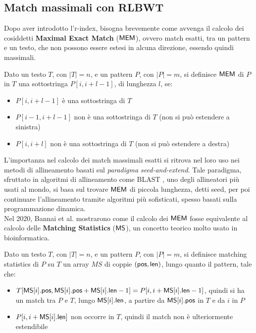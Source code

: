 \subsection{Match massimali con RLBWT}
Dopo aver introdotto l'r-index, bisogna brevemente come avvenga il
calcolo dei cosiddetti \textbf{Maximal Exact Match} ($\mbox{\rm {\sf MEM}}$), ovvero match
esatti, tra un pattern e un testo, che non 
possono essere estesi in alcuna direzione, essendo quindi massimali.
\begin{definizione}
  Dato un testo $T$, con $|T|=n$, e un pattern $P$, con $|P|=m$, si definisce
  $\mbox{\rm {\sf MEM}}$ di $P$ in $T$ una sottostringa $P[i,i+l-1]$, di lunghezza $l$,
  se:
  \begin{itemize}
    \item $P[i,i+l-1]$ è una sottostringa di $T$
    \item $P[i-1,i+l-1]$ non è una sottostringa di $T$ (non si può estendere a
    sinistra) 
    \item $P[i,i+l]$ non è una sottostringa di $T$ (non si può estendere a
    destra) 
  \end{itemize}
\end{definizione}
L'importanza nel calcolo dei match massimali esatti si ritrova nel loro uso nei
metodi di allineamento basati sul \textit{paradigma seed-and-extend}.
Tale paradigma, sfruttato in algoritmi di allineamento come BLAST
\cite{blast}, uno degli allineatori più usati al mondo, si basa sul trovare
$\mbox{\rm {\sf MEM}}$ di piccola lunghezza, detti seed, per poi continuare
l'allineamento tramite algoritmi più sofisticati, spesso basati sulla
programmazione dinamica. \\
Nel 2020, Bannai et al. \cite{bannai} mostrarono come il calcolo dei
$\mbox{\rm {\sf MEM}}$ fosse equivalente al calcolo delle \textbf{Matching Statistics} ($\mbox{\rm {\sf MS}}$), 
un concetto teorico molto usato in
bioinformatica. 
\begin{definizione}
  Dato un testo $T$, con $|T|=n$, e un pattern $P$, con $|P|=m$, si definisce
  matching statistics di $P$ su $T$ un array $MS$ di coppie $(\mbox{\rm {\sf pos}},
  \mbox{\rm {\sf len}})$, lungo quanto il pattern, tale che:
  \begin{itemize}
    \item $T[\mbox{\rm {\sf MS}}[i].\mbox{\rm {\sf pos}},\mbox{\rm {\sf MS}}[i].\mbox{\rm {\sf pos}}+\mbox{\rm {\sf MS}}[i].\mbox{\rm {\sf len}}-1]=
    P[i,i+\mbox{\rm {\sf MS}}[i].\mbox{\rm {\sf len}}-1]$, quindi si ha
    un match tra $P$ e $T$, lungo $\mbox{\rm {\sf MS}}[i].\mbox{\rm {\sf len}}$, a partire da $\mbox{\rm {\sf MS}}[i].\mbox{\rm {\sf pos}}$ 
    in $T$ e da $i$ in $P$
    \item $P[i,i+\mbox{\rm {\sf MS}}[i].\mbox{\rm {\sf len}}]$ non occorre in $T$, quindi il match non è
    ulteriormente estendibile 
  \end{itemize}
\end{definizione}
